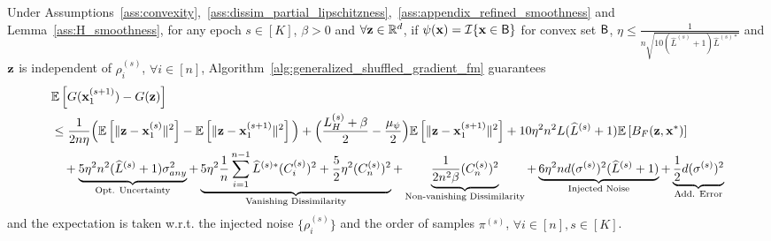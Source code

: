 \begin{lemma}
\label{lemma:expected_one_epoch_convergence_proj}
    Under Assumptions~\ref{ass:convexity},~\ref{ass:dissim_partial_lipschitzness},~\ref{ass:appendix_refined_smoothness} and Lemma~\ref{ass:H_smoothness}, for any epoch $s\in [K]$, $\beta > 0$ and $\forall {\mathbf{z}} \in \mathbb{R}^d$, 
    if $\psi({\mathbf{x}}) = {\mathcal{I}}\{{\mathbf{x}}\in {\mathsf{B}}\}$ for convex set ${\mathsf{B}}$, $\eta \leq \frac{1}{n\sqrt{10 (\widehat{L}^{(s)} +1) \widehat{L}^{(s)*}}}$ and ${\mathbf{z}}$ is independent of $\rho_i^{(s)}$, $\forall i\in [n]$,
    Algorithm~\ref{alg:generalized_shuffled_gradient_fm} guarantees
    \begin{align}
        &\mathbb{E}\left[G({\mathbf{x}}_1^{(s+1)}) - G({\mathbf{z}})\right]\\
        \nonumber
        &\leq \frac{1}{2n\eta}\Big(\mathbb{E}\left[\|{\mathbf{z}} - {\mathbf{x}}_1^{(s)}\|^2 \right] - \mathbb{E}\left[\| {\mathbf{z}} - {\mathbf{x}}_1^{(s+1)}\|^2 \right] \Big)
        + \Big( \frac{L_H^{(s)} + \beta}{2} - \frac{\mu_{\psi}}{2} \Big) \mathbb{E}\left[\| {\mathbf{z}} - {\mathbf{x}}_1^{(s+1)}\|^2 \right] 
        + 10 \eta^2 n^2 L (\widehat{L}^{(s)} +1) \mathbb{E}\left[B_F({\mathbf{z}}, {\mathbf{x}}^*)\right]\\
        \nonumber
        &\quad
        + \underbrace{ 5\eta^2 n^2 (\widehat{L}^{(s)} +1) \sigma_{any}^2 }_{\text{Opt. Uncertainty}}
        + \underbrace{ 5\eta^2 \frac{1}{n}\sum_{i=1}^{n-1} \widehat{L}^{(s)*} (C_i^{(s)})^2
        + \frac{5}{2}\eta^2 (C_n^{(s)})^2
        }_{\text{Vanishing Dissimilarity}}
        + \underbrace{ \frac{1}{2n^2 \beta}(C_n^{(s)})^2 }_{\text{Non-vanishing Dissimilarity}}
        + \underbrace{ 6 \eta^2 nd (\sigma^{(s)})^2 (\widehat{L}^{(s)}+1) }_{\text{Injected Noise}}
        + \underbrace{ \frac{1}{2}d (\sigma^{(s)})^2}_{\text{Add. Error}}
    \end{align}
    and the expectation is taken w.r.t. the injected noise $\{\rho_i^{(s)}\}$ and the order of samples $\pi^{(s)}$, $\forall i\in [n], s\in [K]$.
\end{lemma}


